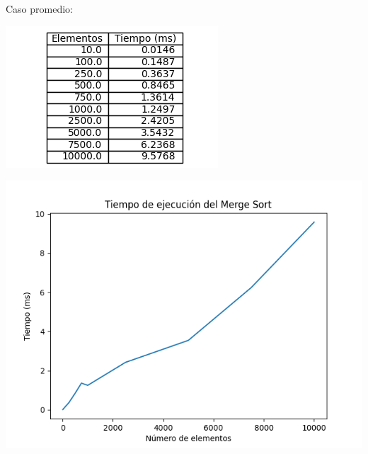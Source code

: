 \documentclass[14pt,a4paper]{report}
\begin{document}
Caso promedio:
\begin{center}
\includegraphics[scale=1]{../tabla-merge-mean.png}  
\end{center}
\begin{center}
\includegraphics[scale=1]{../grafica-merge-mean.png} 
\end{center}
\newpage
\end{document}
